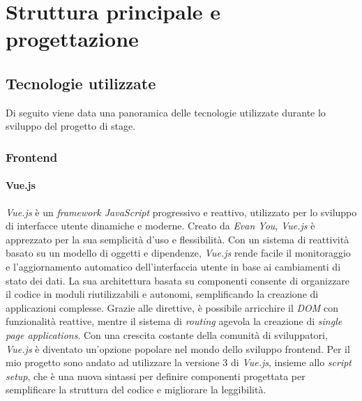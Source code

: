 \chapter{Struttura principale e progettazione}\label{cap:struttura-progettazione}


\section{Tecnologie utilizzate}\label{sec:tecnologie-utilizzate}
Di seguito viene data una panoramica delle tecnologie utilizzate durante lo sviluppo del progetto di stage.

\subsection{Frontend}\label{subsec:frontend}
\subsubsection{Vue.js}\label{subsubsec:vue}
\textit{Vue.js} è un \textit{framework JavaScript} progressivo e reattivo, utilizzato per lo sviluppo di interfacce utente dinamiche e moderne. 
Creato da \textit{Evan You}, \textit{Vue.js} è apprezzato per la sua semplicità d'uso e flessibilità. Con un sistema di reattività basato su un modello di oggetti e dipendenze, 
\textit{Vue.js} rende facile il monitoraggio e l'aggiornamento automatico dell'interfaccia utente in base ai cambiamenti di stato dei dati. La sua architettura basata 
su componenti consente di organizzare il codice in moduli riutilizzabili e autonomi, semplificando la creazione di applicazioni complesse. 
Grazie alle direttive, è possibile arricchire il \textit{DOM} con funzionalità reattive, mentre il sistema di \textit{routing} agevola la creazione di \textit{single page applications}. 
Con una crescita costante della comunità di sviluppatori, \textit{Vue.js} è diventato un'opzione popolare nel mondo dello sviluppo frontend.
Per il mio progetto sono andato ad utilizzare la versione 3 di \textit{Vue.js}, insieme allo \textit{script setup}, che è una nuova sintassi per definire componenti progettata per semplificare la struttura del codice e migliorare la leggibilità.

